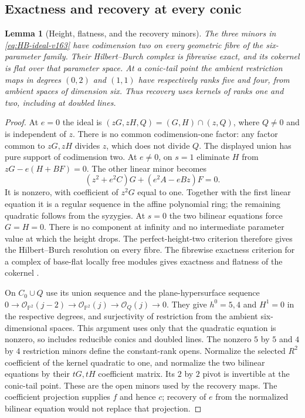 \documentclass[11pt,reqno]{amsart}
\numberwithin{equation}{section}
\newtheorem{lemma}[theorem]{Lemma}
\theoremstyle{definition}\newtheorem{definition}[theorem]{Definition}
\theoremstyle{remark}\newtheorem{remark}[theorem]{Remark}
\newcommand{\Pj}{\mathbb P}\newcommand{\A}{\mathbb A}
\newcommand{\OO}{\mathcal O}\newcommand{\II}{\mathcal I}
\begin{document}
\subsection{Exactness and recovery at every conic}
\begin{lemma}[Height, flatness, and the recovery minors]
\label{lem:HB-details-v166}
The three minors in \eqref{eq:HB-ideal-v163} have codimension two
on every geometric fibre of the six-parameter family. Their
Hilbert--Burch complex is fibrewise exact, and its cokernel is flat
over that parameter space. At a conic-tail point the ambient
restriction maps in degrees $(0,2)$ and $(1,1)$ have respectively
ranks five and four, from ambient spaces of dimension six. Thus
recovery uses kernels of ranks one and two, including at doubled
lines.
\end{lemma}
\begin{proof}
At $e=0$ the ideal is
$(zG,zH,Q)=(G,H)\cap(z,Q)$, where $Q\ne0$ and is independent of
$z$. There is no common codimension-one factor: any factor common
to $zG,zH$ divides $z$, which does not divide $Q$. The displayed
union has pure support of codimension two. At $e\ne0$, on $s=1$
eliminate $H$ from $zG-e(H+BF)=0$. The other linear minor becomes
\[
 (z^2+e^2C)G+(e^2A-eBz)F=0.
\]
It is nonzero, with coefficient of $z^2G$ equal to one. Together
with the first linear equation it is a regular sequence in the
affine polynomial ring; the remaining quadratic follows from the
syzygies. At $s=0$ the two bilinear equations force $G=H=0$.
There is no component at infinity and no intermediate parameter
value at which the height drops. The perfect-height-two criterion
therefore gives the Hilbert--Burch resolution on every fibre.
The fibrewise exactness criterion for a complex of base-flat locally
free modules gives exactness and flatness of the cokernel
\cite[Lemma 10.99.5]{Stacks166}.

On $C_0\cup Q$ use its union sequence and the plane-hypersurface
sequence $0\to\OO_{\Pj^2}(j-2)\to\OO_{\Pj^2}(j)
\to\OO_Q(j)\to0$. They give $h^0=5,4$ and $H^1=0$ in the
respective degrees, and surjectivity of restriction from the
ambient six-dimensional spaces. This argument uses only that the
quadratic equation is nonzero, so includes reducible conics and
doubled lines. The nonzero $5$ by $5$ and $4$ by $4$ restriction
minors define the constant-rank opens. Normalize the selected
$R^2$ coefficient of the kernel quadratic to one, and normalize
the two bilinear equations by their $tG,tH$ coefficient matrix.
Its $2$ by $2$ pivot is invertible at the conic-tail point. These
are the open minors used by the recovery maps. The coefficient
projection supplies $f$ and hence $c$; recovery of $e$ from the
normalized bilinear equation would not replace that projection.
\end{proof}
\end{document}
